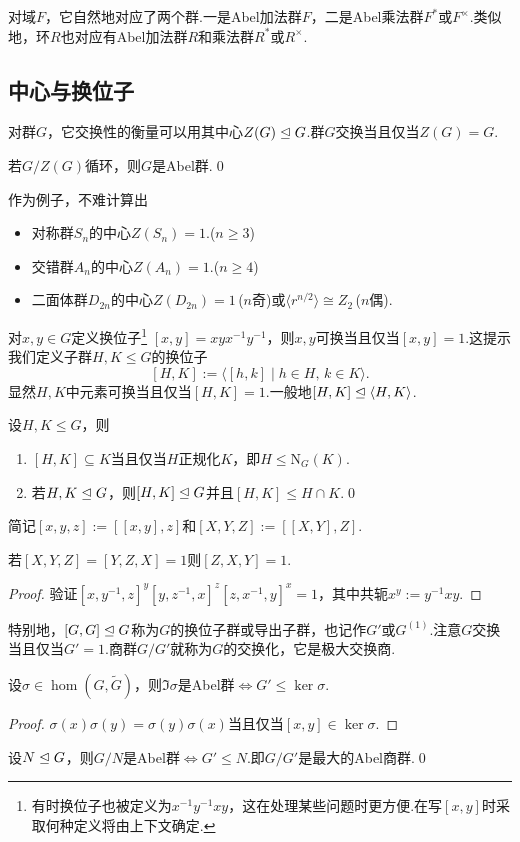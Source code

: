 对域$F$，它自然地对应了两个群.一是Abel加法群$F$，二是Abel乘法群$F^*$或$F^\times$.类似地，环$R$也对应有Abel加法群$R$和乘法群$R^*$或$R^\times$.
\subsection{中心与换位子}
对群$G$，它交换性的衡量可以用其中心$Z(G)\trianglelefteq G$.群$G$交换当且仅当$Z(G)=G$.
\begin{prop}
	若$G/Z(G)$循环，则$G$是Abel群.\qed
\end{prop}

作为例子，不难计算出
\begin{itemize}
	\item 对称群$S_n$的中心$Z(S_n)=1$.($n\ge 3$)
	\item 交错群$A_n$的中心$Z(A_n)=1$.($n\ge 4$)
	\item 二面体群$D_{2n}$的中心$Z(D_{2n})=1$\,($n$奇)或$\langle r^{n/2}\rangle \cong Z_2$\,($n$偶).
\end{itemize}

对$x,y\in G$定义{\heiti 换位子}\footnote{有时换位子也被定义为$x^{-1}y^{-1}xy$，这在处理某些问题时更方便.在写$[x,y]$时采取何种定义将由上下文确定.} $[x,y]=xyx^{-1}y^{-1}$，则$x,y$可换当且仅当$[x,y]=1$.这提示我们定义子群$H,K\le G$的{\heiti 换位子}
\[
	[H,K]:=\langle [h,k]\mid h\in H,\,k\in K\rangle .
\]
显然$H,K$中元素可换当且仅当$[H,K]=1$.一般地$[H,K]\trianglelefteq\langle H,K\rangle $.
\begin{lemma}
	设$H,K\le G$，则
	\begin{enumerate}
		\item $[H,K]\subseteq K$当且仅当$H$正规化$K$，即$H\le\mathrm{N}_G(K)$.
		\item 若$H,K\trianglelefteq G$，则$[H,K]\trianglelefteq G$并且$[H,K]\le H\cap K$.\qed
	\end{enumerate}
\end{lemma}

简记$[x,y,z]:=[[x,y],z]$和$[X,Y,Z]:=[[X,Y],Z]$.
\begin{lemma*}[(三子群引理)]
	若$[X,Y,Z]=[Y,Z,X]=1$则$[Z,X,Y]=1$.
\end{lemma*}
\begin{proof}
	验证$[x,y^{-1},z]^y[y,z^{-1},x]^z[z,x^{-1},y]^x=1$，其中共轭$x^y:=y^{-1}xy$.
\end{proof}

特别地，$[G,G]\trianglelefteq G$称为$G$的{\heiti 换位子群}或{\heiti 导出子群}，也记作$G'$或$G^{(1)}$.注意$G$交换当且仅当$G'=1$.商群$G/G'$就称为$G$的{\heiti 交换化}，它是极大交换商.\hypertarget{text:Abelianization}{}
\begin{prop}
	设$\sigma\in\hom(G,\tilde{G})$，则$\Im\sigma$是Abel群$\iff G'\le\ker\sigma$.
\end{prop}
\begin{proof}
	$\sigma(x)\sigma(y)=\sigma(y)\sigma(x)$当且仅当$[x,y]\in\ker\sigma$.
\end{proof}
\begin{cor*}
	设$N\trianglelefteq G$，则$G/N$是Abel群$\iff G'\le N$.即$G/G'$是最大的Abel商群.\qed
\end{cor*}

